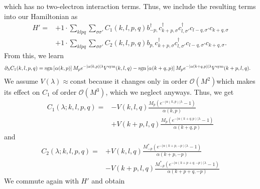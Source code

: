 which has no two-electron interaction terms. Thus, we include the resulting terms into our Hamiltonian as 
\begin{align*}
	H'= 	&+1 \cdot \sum_{ k l p q } \sum_{ \sigma \sigma' } C_1( k, l, p, q )   b_{ -p, }^\dagger  c_{ k+p, \sigma }^\dagger  c_{ l, \sigma' }^\dagger  c_{ l-q, \sigma' } c_{ k+q, \sigma }  \\
	&+1 \cdot \sum_{ k l p q } \sum_{ \sigma \sigma' } C_2( k, l, p, q )   b_{ p, } c_{ k+p, \sigma }^\dagger  c_{ l, \sigma' }^\dagger  c_{ l-q, \sigma' } c_{ k+q, \sigma } 
. \end{align*}
From this, we learn \begin{align*}
	\partial_\lambda C_1(k,l,p,q) &= \operatorname{sgn} \left[\alpha (k, p)\right] M_{p} e^{ - | \alpha (k,p) | \lambda } V^\mathrm{sym}( k, l, q )  - \operatorname{sgn} \left[\alpha (k+q, p)\right] M_{p} e^{ - | \alpha (k+q,p) | \lambda } V^\mathrm{sym}( k+p, l, q ) . \end{align*}
We assume $V(\lambda) \approx \mathrm{const}$ because it changes only in order $\mathcal{O}(M^2)$which makes its effect on $C_1$ of order $\mathcal{O}(M^3)$, which we neglect anyways. Thus, we get \begin{align*}
	C_1(\lambda; k, l, p, q) =&- V(k, l, q) \frac{M_{p} \left(  e^{ - | \alpha (k,p) | \lambda } - 1 \right) }{\alpha (k, p)}\\
		& + V(k+p, l, q) \frac{M_{p} \left(  e^{ - | \alpha (k+q,p) | \lambda } - 1 \right)}{\alpha (k+q, p)}\end{align*}
and
\begin{align*}
	C_2(\lambda; k, l, p, q) =&+ V(k, l, q) \frac{M_{-p}^* \left(  e^{ - | \alpha (k+p,-p) | \lambda } - 1 \right)}{\alpha (k+p, -p)}\\
		& - V(k+p, l, q) \frac{M_{-p}^* \left(  e^{ - | \alpha (k+p+q,-p) | \lambda } - 1 \right)}{\alpha (k+p+q, -p)}\end{align*}
We commute again with $H'$ and obtain
